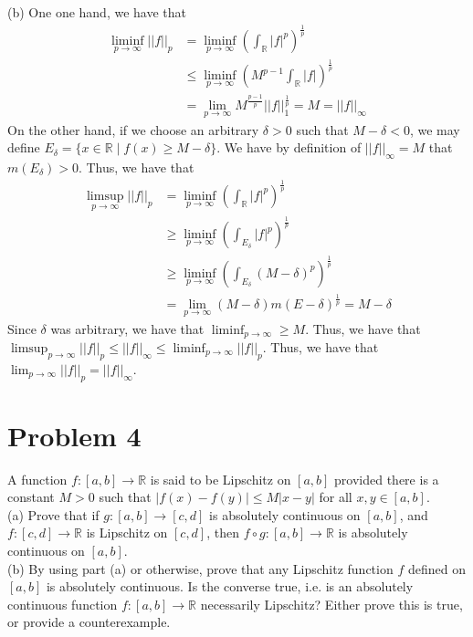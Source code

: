 \documentclass{article}
\begin{document}
\noindent (b) One one hand, we have that 
\begin{align*}
\liminf_{p\rightarrow\infty}||f||_p&=\liminf_{p\rightarrow\infty}\left(\int_\mathbb{R}|f|^p\right)^{\frac{1}{p}}\\
&\leq\liminf_{p\rightarrow\infty}\left(M^{p-1}\int_\mathbb{R}|f|\right)^\frac{1}{p}\\
&=\lim_{p\rightarrow\infty}M^\frac{p-1}{p}||f||_1^\frac{1}{p}=M=||f||_\infty
\end{align*}
On the other hand, if we choose an arbitrary $\delta>0$ such that $M-\delta<0$, we may define $E_\delta=\{x\in\mathbb{R}\mid f(x)\geq M-\delta\}$.  We have by definition of $||f||_\infty=M$ that $m(E_\delta)>0$.  Thus, we have that
\begin{align*}
\limsup_{p\rightarrow\infty}||f||_p&=\liminf_{p\rightarrow\infty}\left(\int_\mathbb{R}|f|^p\right)^{\frac{1}{p}}\\
&\geq\liminf_{p\rightarrow\infty}\left(\int_{E_\delta}|f|^p\right)^\frac{1}{p}\\
&\geq\liminf_{p\rightarrow\infty}\left(\int_{E_\delta}(M-\delta)^p\right)^\frac{1}{p}\\
&=\lim_{p\rightarrow\infty}(M-\delta)m(E-\delta)^\frac{1}{p}=M-\delta
\end{align*}
Since $\delta$ was arbitrary, we have that $\liminf_{p\rightarrow\infty}\geq M$.  Thus, we have that $\limsup_{p\rightarrow\infty}||f||_p\leq||f||_\infty\leq\liminf_{p\rightarrow\infty}||f||_p$.  Thus, we have that $\lim_{p\rightarrow\infty}||f||_p=||f||_\infty$.

\section*{Problem 4}
A function $f:[a,b]\rightarrow\mathbb{R}$ is said to be Lipschitz on $[a,b]$ provided there is a constant $M>0$ such that $|f(x)-f(y)|\leq M|x-y|$ for all $x,y\in[a,b]$.\\

\noindent (a) Prove that if $g:[a,b]\rightarrow[c,d]$ is absolutely continuous on $[a,b]$, and $f:[c,d]\rightarrow\mathbb{R}$ is Lipschitz on $[c,d]$, then $f\circ g:[a,b]\rightarrow\mathbb{R}$ is absolutely continuous on $[a,b]$.\\

\noindent (b) By using part (a) or otherwise, prove that any Lipschitz function $f$ defined on $[a,b]$ is absolutely continuous.  Is the converse true, i.e. is an absolutely continuous function $f:[a,b]\rightarrow\mathbb{R}$ necessarily Lipschitz? Either prove this is true, or provide a counterexample.
\end{document}
